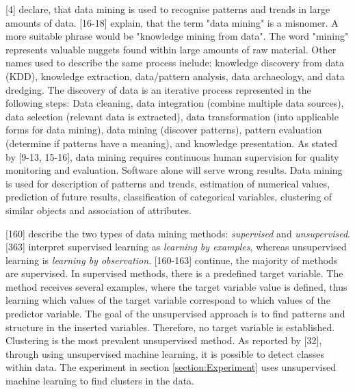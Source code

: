 \textcite{DataMiningAndPredictiveAnalytics}[4] declare, that data mining is used to recognise patterns and trends in large amounts of data. \textcite{han2011data}[16-18] explain, that the term "data mining" is a misnomer. A more suitable phrase would be "knowledge mining from data". The word "mining" represents valuable nuggets found within large amounts of raw material. Other names used to describe the same process include: knowledge discovery from data (KDD), knowledge extraction, data/pattern analysis, data archaeology, and data dredging. The discovery of data is an iterative process represented in the following steps: Data cleaning, data integration (combine multiple data sources), data selection (relevant data is extracted), data transformation (into applicable forms for data mining), data mining (discover patterns), pattern evaluation (determine if patterns have a meaning), and knowledge presentation. 
As stated by \textcite{DataMiningAndPredictiveAnalytics}[9-13, 15-16], data mining requires continuous human supervision for quality monitoring and evaluation. Software alone will serve wrong results. Data mining is used for description of patterns and trends, estimation of numerical values, prediction of future results, classification of categorical variables, clustering of similar objects and association of attributes. 

\textcite{DataMiningAndPredictiveAnalytics}[160] describe the two types of data mining methods: \textit{supervised} and \textit{unsupervised}. \textcite{han2011data}[363] interpret supervised learning as \textit{learning by examples}, whereas unsupervised learning is \textit{learning by observation}. \textcite{DataMiningAndPredictiveAnalytics}[160-163] continue, the majority of methods are supervised. In supervised methods, there is a predefined target variable. The method receives several examples, where the target variable value is defined, thus learning which values of the target variable correspond to which values of the predictor variable. The goal of the unsupervised approach is to find patterns and structure in the inserted variables. Therefore, no target variable is established. Clustering is the most prevalent unsupervised method. As reported by \textcite{han2011data}[32], through using unsupervised machine learning, it is possible to detect classes within data. The experiment in section \ref{section:Experiment} uses unsupervised machine learning to find clusters in the data.

